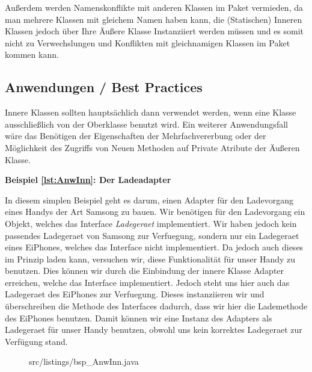 Außerdem werden Namenskonflikte mit anderen Klassen im Paket vermieden, da man mehrere Klassen mit gleichem Namen haben kann,
 die (Statischen) Inneren Klassen jedoch über Ihre Äußere Klasse Instanziiert werden müssen und es somit nicht zu Verwechslungen und Konflikten mit gleichnamigen Klassen im Paket kommen kann.

\subsection{Anwendungen / Best Practices}

Innere Klassen sollten hauptsächlich dann verwendet werden, wenn eine Klasse ausschließlich von der Oberklasse benutzt wird.
Ein weiterer Anwendungsfall wäre das Benötigen der Eigenschaften der Mehrfachvererbung oder der Möglichkeit des Zugriffs von Neuen Methoden auf Private Atribute der Äußeren Klasse.

\newpage

{\bf Beispiel \ref{lst:AnwInn}: Der Ladeadapter}

In diesem simplen Beispiel geht es darum, einen Adapter für den Ladevorgang eines Handys der Art Samsong zu bauen.
Wir benötigen für den Ladevorgang ein Objekt, welches das Interface {\it Ladegeraet} implementiert.
Wir haben jedoch kein passendes Ladegeraet von Samsong zur Verfuegung, sondern nur ein Ladegeraet eines EiPhones, welches das Interface nicht implementiert.
Da jedoch auch dieses im Prinzip laden kann, versuchen wir, diese Funktionalität für unser Handy zu benutzen.
Dies können wir durch die Einbindung der innere Klasse Adapter erreichen, welche das Interface implementiert.
Jedoch steht uns hier auch das Ladegeraet des EiPhones zur Verfuegung.
Dieses instanziieren wir und überschreiben die Methode des Interfaces dadurch, dass wir hier die Lademethode des EiPhones benutzen.
Damit können wir eine Instanz des Adapters als Ladegeraet für unser Handy benutzen, obwohl uns kein korrektes Ladegeraet zur Verfügung stand.
\\
\begin{figure}[hb]
\lstset{language=Java}
 {src/listings/bsp_AnwInn.java}
\end{figure}


\newpage
